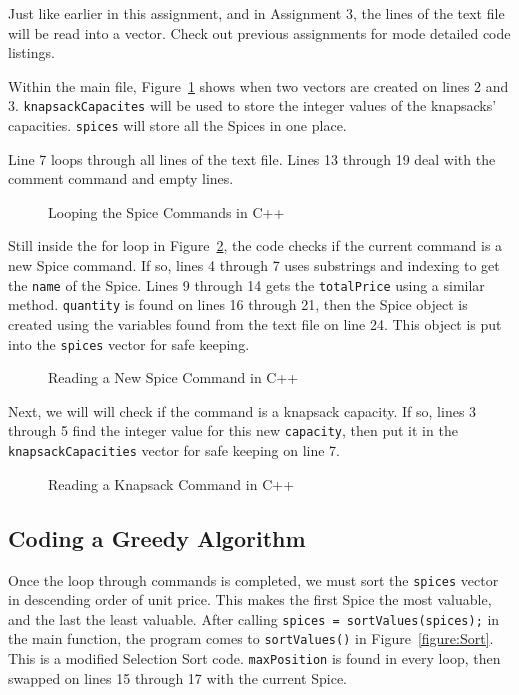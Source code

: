 \documentclass[letterpaper, 10pt,DIV=13]{scrartcl}
\numberwithin{equation}{section} %
\numberwithin{figure}{section} %
\numberwithin{table}{section} %
\begin{document}
Just like earlier in this assignment, and in Assignment 3, the lines of the text file will be read into a vector. Check out previous assignments for mode detailed code listings.

\pagebreak

Within the main file, Figure~\ref{figure:SpiceLoop} shows when two vectors are created on lines 2 and 3. \texttt{knapsackCapacites} will be used to store the integer values of the knapsacks' capacities. \texttt{spices} will store all the Spices in one place.

Line 7 loops through all lines of the text file. Lines 13 through 19 deal with the comment command and empty lines.

\begin{figure}[ht] 
    \centering 
    
    \caption{Looping the Spice Commands in C++}
    \label{figure:SpiceLoop}
\end{figure}


Still inside the for loop in Figure~\ref{figure:ReadSpice}, the code checks if the current command is a new Spice command. If so, lines 4 through 7 uses substrings and indexing to get the \texttt{name} of the Spice. Lines 9 through 14 gets the \texttt{totalPrice} using a similar method. \texttt{quantity} is found on lines 16 through 21, then the Spice object is created using the variables found from the text file on line 24. This object is put into the \texttt{spices} vector for safe keeping.

\begin{figure}[ht] 
    \centering 
    
    \caption{Reading a New Spice Command in C++}
    \label{figure:ReadSpice}
\end{figure}


\pagebreak

Next, we will will check if the command is a knapsack capacity. If so, lines 3 through 5 find the integer value for this new \texttt{capacity}, then put it in the \texttt{knapsackCapacities} vector for safe keeping on line 7.

\begin{figure}[ht] 
    \centering 
    
    \caption{Reading a Knapsack Command in C++}
    \label{figure:ReadKnapsack}
\end{figure}


\subsection{Coding a Greedy Algorithm}
Once the loop through commands is completed, we must sort the \texttt{spices} vector in descending order of unit price. This makes the first Spice the most valuable, and the last the least valuable. After calling \texttt{spices = sortValues(spices);} in the main function, the program comes to \texttt{sortValues()} in Figure~\ref{figure:Sort}. This is a modified Selection Sort code. \texttt{maxPosition} is found in every loop, then swapped on lines 15 through 17 with the current Spice.
\end{document}
